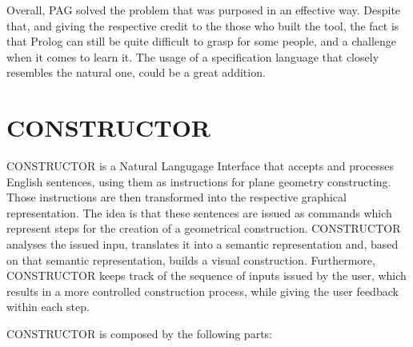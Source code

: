 Overall, PAG solved the problem that was purposed in an effective way. 
Despite that, and giving the respective credit to the those who built the tool, the fact is that Prolog can still be quite difficult to grasp for some people, and a challenge when it comes to learn it. 
The usage of a specification language that closely resembles the natural one, could be a great addition.


\section{CONSTRUCTOR}
CONSTRUCTOR \cite{alexin_1990} is a Natural Langugage Interface that accepts and processes English sentences,
using them as instructions for plane geometry constructing.
Those instructions are then transformed into the respective graphical representation.
The idea is that these sentences are issued as commands which represent steps for the creation of a geometrical construction.
CONSTRUCTOR analyses the issued inpu, translates it into a semantic representation and, based on that semantic representation, builds a visual construction.
Furthermore, CONSTRUCTOR keeps track of the sequence of inputs issued by the user, which results in a more controlled construction process,
while giving the user feedback within each step.

\noindent CONSTRUCTOR is composed by the following parts:


